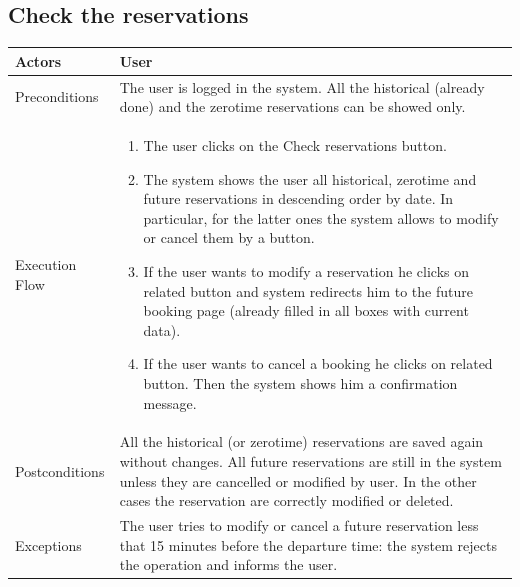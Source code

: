 \subsection{Check the reservations}
\begin{tabular}{lp{8cm}}
	\hline 
	Actors & User \\ \hline
	Preconditions & The user is logged in the system.
All the historical (already done) and the zerotime reservations can be showed only. \\ \hline
	Execution Flow & \begin{enumerate}
					\item The user clicks on the Check reservations button.			
					\item The system shows the user all historical, zerotime and future reservations in descending order by date. In particular, for the latter ones the system allows to modify or cancel them by a button.
					\item If the user wants to modify a reservation he clicks on related button and system redirects him to the future booking page (already filled in all boxes with current data).
					\item If the user wants to cancel a booking he clicks on related button. Then the system shows him a confirmation message.
				\end{enumerate}
	 \\ \hline
	 Postconditions & All the historical (or zerotime) reservations are saved again without changes. All future reservations are still in the system unless they are cancelled or modified by user. In the other cases the reservation are correctly modified or deleted.\\ \hline
	 Exceptions & The user tries to modify or cancel a future reservation less that 15 minutes before the departure time: the system rejects the operation and informs the user.  \\ \hline
\end{tabular}

\clearpage

